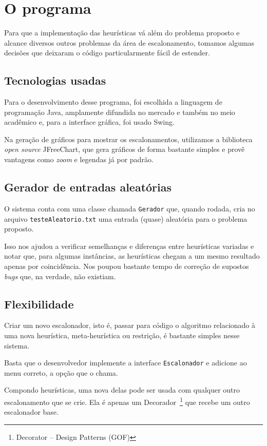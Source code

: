 \section{O programa}

Para que a implementação das heurísticas vá além do problema proposto e alcance diversos outros problemas da área de escalonamento, tomamos algumas decisões que deixaram o código particularmente fácil de estender.

\subsection{Tecnologias usadas}

Para o desenvolvimento desse programa, foi escolhida a linguagem de programação Java, amplamente difundida no mercado e também no meio acadêmico e, para a interface gráfica, foi usado Swing. 

Na geração de gráficos para mostrar os escalonamentos, utilizamos a biblioteca \textit{open source} JFreeChart, que gera gráficos de forma bastante simples e provê vantagens como \textit{zoom} e legendas já por padrão.

\subsection{Gerador de entradas aleatórias}

O sistema conta com uma classe chamada \texttt{Gerador} que, quando rodada, cria no arquivo \texttt{testeAleatorio.txt} uma entrada (quase) aleatória para o problema proposto.

Isso nos ajudou a verificar semelhanças e diferenças entre heurísticas variadas e notar que, para algumas instâncias, as heurísticas chegam a um mesmo resultado apenas por coincidência. Nos poupou bastante tempo de correção de supostos \textit{bugs} que, na verdade, não existiam.  

\subsection{Flexibilidade} 

Criar um novo escalonador, isto é, passar para código o algoritmo relacionado à uma nova heurística, meta-heurística ou restrição, é bastante simples nesse sistema.

Basta que o desenvolvedor implemente a interface \texttt{Escalonador} e adicione ao menu correto, a opção que o chama.

Compondo heurísticas, uma nova delas pode ser usada com qualquer outro escalonamento que se crie. Ela é apenas um Decorador~\footnote{Decorator -- Design Patterns (GOF)} que recebe um outro escalonador base. 

